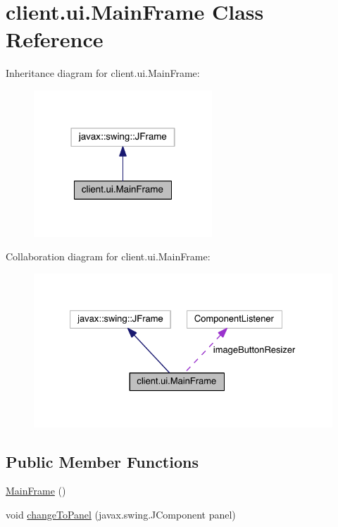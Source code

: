 \hypertarget{classclient_1_1ui_1_1_main_frame}{}\section{client.\+ui.\+Main\+Frame Class Reference}
\label{classclient_1_1ui_1_1_main_frame}


Inheritance diagram for client.\+ui.\+Main\+Frame\+:
\nopagebreak
\begin{figure}[H]
\begin{center}
\leavevmode
\includegraphics[width=190pt]{classclient_1_1ui_1_1_main_frame__inherit__graph}
\end{center}
\end{figure}


Collaboration diagram for client.\+ui.\+Main\+Frame\+:
\nopagebreak
\begin{figure}[H]
\begin{center}
\leavevmode
\includegraphics[width=327pt]{classclient_1_1ui_1_1_main_frame__coll__graph}
\end{center}
\end{figure}
\subsection*{Public Member Functions}
\begin{DoxyCompactItemize}
\item 
\hyperlink{classclient_1_1ui_1_1_main_frame_ac3662d47eb66c2009f7fc3d0e274a703}{Main\+Frame} ()
\item 
void \hyperlink{classclient_1_1ui_1_1_main_frame_ae415687be6f7197dd0d70d65d08d5221}{change\+To\+Panel} (javax.\+swing.\+J\+Component panel)
\end{DoxyCompactItemize}
